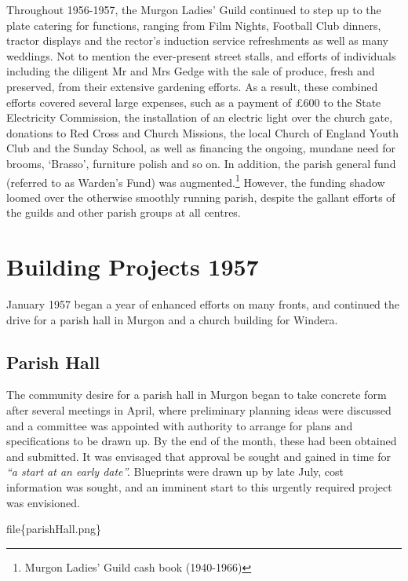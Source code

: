 Throughout 1956-1957, the Murgon Ladies' Guild continued to step up to the plate catering for functions, ranging from Film Nights, Football Club dinners, tractor displays and the rector's induction service refreshments as well as many weddings. Not to mention the ever-present street stalls, and efforts of individuals including the diligent Mr and Mrs Gedge with the sale of produce, fresh and preserved, from their extensive gardening efforts. As a result, these combined efforts covered several large expenses, such as a payment of £600 to the State Electricity Commission, the installation of an electric light over the church gate, donations to Red Cross and Church Missions, the local Church of England Youth Club and the Sunday School, as well as financing the ongoing, mundane need for brooms, `Brasso', furniture polish and so on. In addition, the parish general fund (referred to as Warden's Fund) was augmented.\footnote{Murgon Ladies' Guild cash book (1940-1966)} However, the funding shadow loomed over the otherwise smoothly running parish, despite the gallant efforts of the guilds and other parish groups at all centres.

\hypertarget{building-projects-1957}{%
\section{Building Projects 1957}\label{building-projects-1957}}

January 1957 began a year of enhanced efforts on many fronts, and continued the drive for a parish hall in Murgon and a church building for Windera.

\hypertarget{parish-hall}{%
\subsection{Parish Hall}\label{parish-hall}}

The community desire for a parish hall in Murgon began to take concrete form after several meetings in April, where preliminary planning ideas were discussed and a committee was appointed with authority to arrange for plans and specifications to be drawn up. By the end of the month, these had been obtained and submitted. It was envisaged that approval be sought and gained in time for \emph{``a start at an early date''.} Blueprints were drawn up by late July, cost information was sought, and an imminent start to this urgently required project was envisioned.

file\{parishHall.png\}

